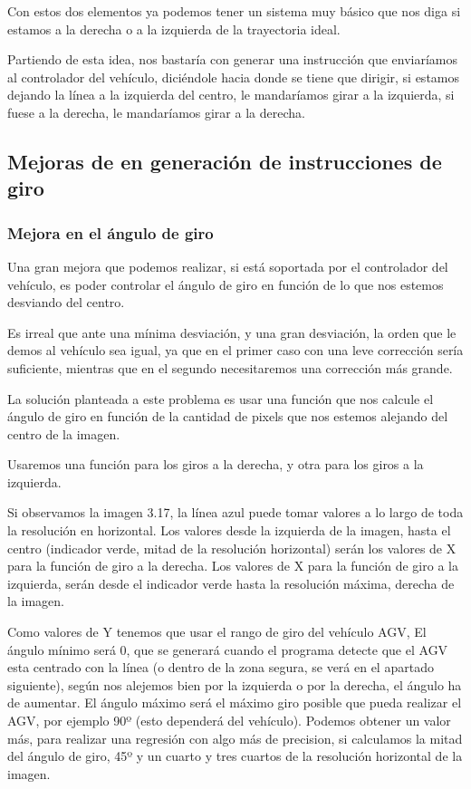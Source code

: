 Con estos dos elementos ya podemos tener un sistema muy básico que nos diga si estamos a la derecha o a la izquierda de la trayectoria ideal.

Partiendo de esta idea, nos bastaría con generar una instrucción que enviaríamos al controlador del vehículo, diciéndole hacia donde se tiene que dirigir, si estamos dejando la línea a la izquierda del centro, le mandaríamos girar a la izquierda, si fuese a la derecha, le mandaríamos girar a la derecha.

\subsection{Mejoras de en generación de instrucciones de giro}

\subsubsection{Mejora en el ángulo de giro}
Una gran mejora que podemos realizar, si está soportada por el controlador del vehículo, es poder controlar el ángulo de giro en función de lo que nos estemos desviando del centro. 

Es irreal que ante una mínima desviación, y una gran desviación, la orden que le demos al vehículo sea igual, ya que en el primer caso con una leve corrección sería suficiente, mientras que en el segundo necesitaremos una corrección más grande.

La solución planteada a este problema es usar una función que nos calcule el ángulo de giro en función de la cantidad de pixels que nos estemos alejando del centro de la imagen. 

Usaremos una función para los giros a la derecha, y otra para los giros a la izquierda.

Si observamos la imagen 3.17, la línea azul puede tomar valores a lo largo de toda la resolución en horizontal. Los valores desde la izquierda de la imagen, hasta el centro (indicador verde, mitad de la resolución horizontal) serán los valores de X para la función de giro a la derecha. Los valores de X para la función de giro a la izquierda, serán desde el indicador verde hasta la resolución máxima, derecha de la imagen.

Como valores de Y tenemos que usar el rango de giro del vehículo AGV, El ángulo mínimo será 0, que se generará cuando el programa detecte que el AGV esta centrado con la línea (o dentro de la zona segura, se verá en el apartado siguiente), según nos alejemos bien por la izquierda o por la derecha, el ángulo ha de aumentar. El ángulo máximo será el máximo giro posible que pueda realizar el AGV, por ejemplo 90º (esto dependerá del vehículo). Podemos obtener un valor más, para realizar una regresión con algo más de precision, si calculamos la mitad del ángulo de giro, 45º y un cuarto y tres cuartos de la resolución horizontal de la imagen. 

